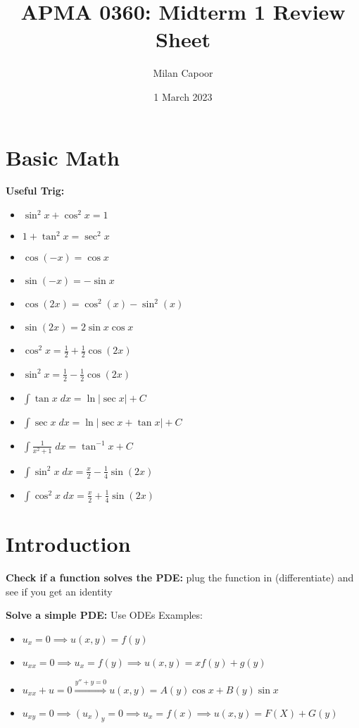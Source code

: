 \documentclass[12pt]{article}
\title{APMA 0360: Midterm 1 Review Sheet}
\author{Milan Capoor}
\date{1 March 2023}
\begin{document}
\maketitle
\section*{Basic Math}
\textbf{Useful Trig:}
\begin{itemize}
    \item $\sin^2 x + \cos^2 x = 1$
    \item $1 + \tan^2 x = \sec^2 x$
    \item $\cos(-x) = \cos x$
    \item $\sin(-x) = -\sin x$
    \item $\cos(2x) = \cos^2(x) - \sin^2(x)$
    \item $\sin(2x) = 2\sin x \cos x $
    \item $\cos^2 x = \frac{1}{2} + \frac{1}{2} \cos (2x)$
    \item $\sin^2 x = \frac{1}{2} - \frac{1}{2}\cos (2x)$
    \item $\int \tan x \; dx = \ln | \sec x | + C$
    \item $\int \sec x\; dx = \ln|\sec x + \tan x| + C$
    \item $\int \frac{1}{x^2 + 1}\; dx = \tan^{-1} x + C$
    \item $\int \sin^2 x\; dx = \frac{x}{2} - \frac{1}{4}\sin(2x)$   
    \item $\int \cos^2 x \; dx = \frac{x}{2} + \frac{1}{4} \sin(2x)$ 
\end{itemize}

\section*{Introduction}
\textbf{Check if a function solves the PDE:} plug the function in (differentiate) and see if you get an identity

\textbf{Solve a simple PDE:} Use ODEs
Examples:
\begin{itemize}
    \item $u_x = 0 \implies u(x, y) = f(y)$
    \item $u_{xx} = 0 \implies u_x = f(y) \implies u(x, y) = xf(y) + g(y)$
    \item $u_{xx} +u = 0 \overset{y'' + y = 0}{\Longrightarrow} u(x, y) = A(y) \cos x + B(y) \sin x$
    \item $u_{xy}= 0 \implies (u_x)_y = 0 \implies u_x = f(x) \implies u(x, y) = F(X) + G(y)$
\end{itemize}
\end{document}
